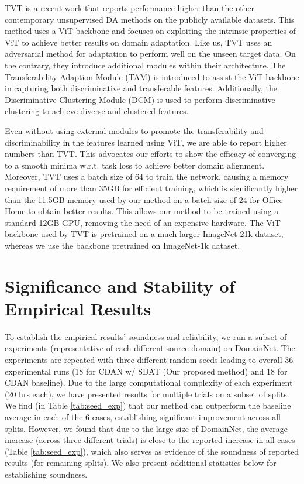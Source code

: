 \documentclass[table,dvipsnames]{article}
\theoremstyle{plain}
\theoremstyle{definition}
\theoremstyle{remark}
\begin{document}
TVT \cite{yang2021tvt} is a recent work that reports performance higher than the other contemporary unsupervised DA methods on the publicly available datasets. This method uses a ViT backbone and focuses on exploiting the intrinsic properties of ViT to achieve better results on domain adaptation. 
Like us, TVT uses an adversarial method for adaptation to perform well on the unseen target data. On the contrary, they introduce additional modules within their architecture. The Transferability Adaption Module (TAM) is introduced to assist the ViT backbone in capturing both discriminative and transferable features. Additionally, the Discriminative Clustering Module (DCM) is used to perform discriminative clustering to achieve diverse and clustered features. 

Even without using external modules to promote the transferability and discriminability in the features learned using ViT, we are able to report higher numbers than TVT. This advocates our efforts to show the efficacy of converging to a smooth minima w.r.t. task loss to achieve better domain alignment. Moreover, TVT uses a batch size of 64 to train the network, causing a memory requirement of more than 35GB for efficient training, which is significantly higher than the 11.5GB memory used by our method on a batch-size of 24 for Office-Home to obtain better results. This allows our method to be trained using a standard 12GB GPU, removing the need of an expensive hardware. The ViT backbone used by TVT is pretrained on a much larger ImageNet-21k dataset, whereas we use the backbone pretrained on ImageNet-1k dataset.   

\section{
{Significance and Stability of Empirical Results}}
\label{app:stats_sig}
To establish the empirical results' soundness and reliability, we run a subset of experiments (representative of each different source domain) on DomainNet. The experiments are repeated with three different random seeds leading to overall 36 experimental runs (18 for CDAN w/ SDAT (Our proposed method) and 18 for CDAN baseline). 
Due to the large computational complexity of each experiment (20 hrs each), we have presented results for multiple trials on a subset of splits. We find (in Table \ref{tab:seed_exp}) that our method can outperform the baseline average in each of the 6 cases, establishing significant improvement across all splits. However, we found that due to the large size of DomainNet, the average increase (across three different trials) is close to the reported increase in all cases (Table \ref{tab:seed_exp}), which also serves as evidence of the soundness of reported results (for remaining splits). We also present additional statistics below for establishing soundness.
\end{document}
